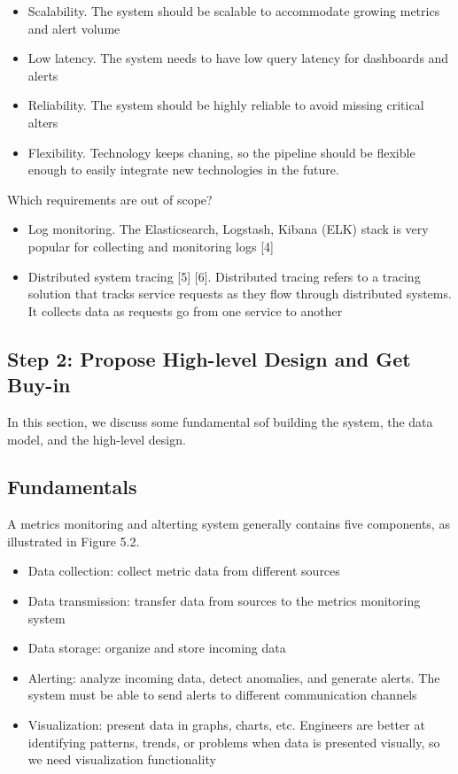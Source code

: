\documentclass{report}
\theoremstyle{definition}
\let\oldsubsection\subsection
\renewcommand{\subsection}{\oldsubsection*}
\begin{document}
\begin{itemize}
\item
Scalability. The system should be scalable to accommodate growing metrics and alert volume
\item
Low latency. The system needs to have low query latency for dashboards and alerts
\item
Reliability. The system should be highly reliable to avoid missing critical alters
\item
Flexibility. Technology keeps chaning, so the pipeline should be flexible enough to easily integrate new technologies in the future.
\end{itemize}

Which requirements are out of scope?

\begin{itemize}
\item
Log monitoring. The Elasticsearch, Logstash, Kibana (ELK) stack is very popular for collecting and monitoring logs [4]
\item
Distributed system tracing [5] [6]. Distributed tracing refers to a tracing solution that tracks service requests as they flow through distributed systems. It collects data as requests go from one service to another
\end{itemize}

\subsection{Step 2: Propose High-level Design and Get Buy-in}

In this section, we discuss some fundamental sof building the system, the data model, and the high-level design.

\subsection{Fundamentals}

A metrics monitoring and alterting system generally contains five components, as illustrated in Figure 5.2.

\begin{itemize}
\item
Data collection: collect metric data from different sources
\item
Data transmission: transfer data from sources to the metrics monitoring system
\item
Data storage: organize and store incoming data
\item
Alerting: analyze incoming data, detect anomalies, and generate alerts. The system must be able to send alerts to different communication channels
\item
Visualization: present data in graphs, charts, etc. Engineers are better at identifying patterns, trends, or problems when data is presented visually, so we need visualization functionality
\end{itemize}
\end{document}
